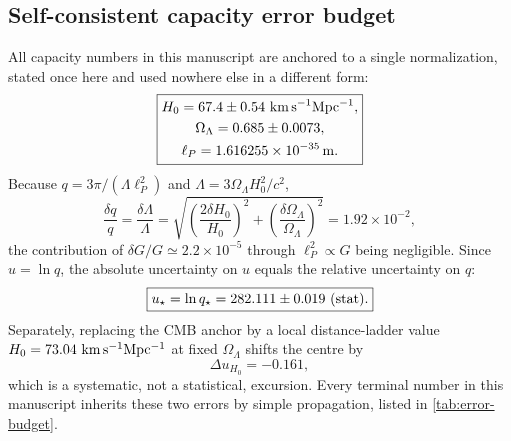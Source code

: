 \documentclass[aps,prd,reprint,nofootinbib,superscriptaddress,floatfix]{revtex4-2}
\numberwithin{equation}{section}
\theoremstyle{definition}
\theoremstyle{plain}
\begin{document}
\subsection{Self-consistent capacity error budget}

All capacity numbers in this manuscript are anchored to a single
normalization, stated once here and used nowhere else in a different form:
\begin{equation}
\boxed{
\begin{gathered}
H_0=67.4\pm0.54\ {\rm km\,s^{-1}Mpc^{-1}},\\
\Omega_\Lambda=0.685\pm0.0073,\\
\ell_P=1.616255\times10^{-35}\,{\rm m}.
\end{gathered}}
\label{eq:capacity-anchor}
\end{equation}
Because \(q=3\pi/(\Lambda\ell_P^2)\) and \(\Lambda=3\Omega_\Lambda H_0^2/c^2\),
\begin{equation}
\frac{\delta q}{q}
=\frac{\delta\Lambda}{\Lambda}
=\sqrt{\left(\frac{2\delta H_0}{H_0}\right)^2
+\left(\frac{\delta\Omega_\Lambda}{\Omega_\Lambda}\right)^2}
=1.92\times10^{-2},
\end{equation}
the contribution of \(\delta G/G\simeq2.2\times10^{-5}\) through
\(\ell_P^2\propto G\) being negligible.  Since \(u=\ln q\), the absolute
uncertainty on \(u\) equals the relative uncertainty on \(q\):
\begin{equation}
\boxed{
u_\star=\ln q_\star=282.111\pm0.019\ ({\rm stat}).
}
\end{equation}
Separately, replacing the CMB anchor by a local distance-ladder value
\(H_0=73.04\ {\rm km\,s^{-1}Mpc^{-1}}\) at fixed \(\Omega_\Lambda\) shifts the
centre by
\begin{equation}
\Delta u_{H_0}=-0.161,
\end{equation}
which is a systematic, not a statistical, excursion.  Every terminal number
in this manuscript inherits these two errors by simple propagation, listed in
\cref{tab:error-budget}.
\end{document}
